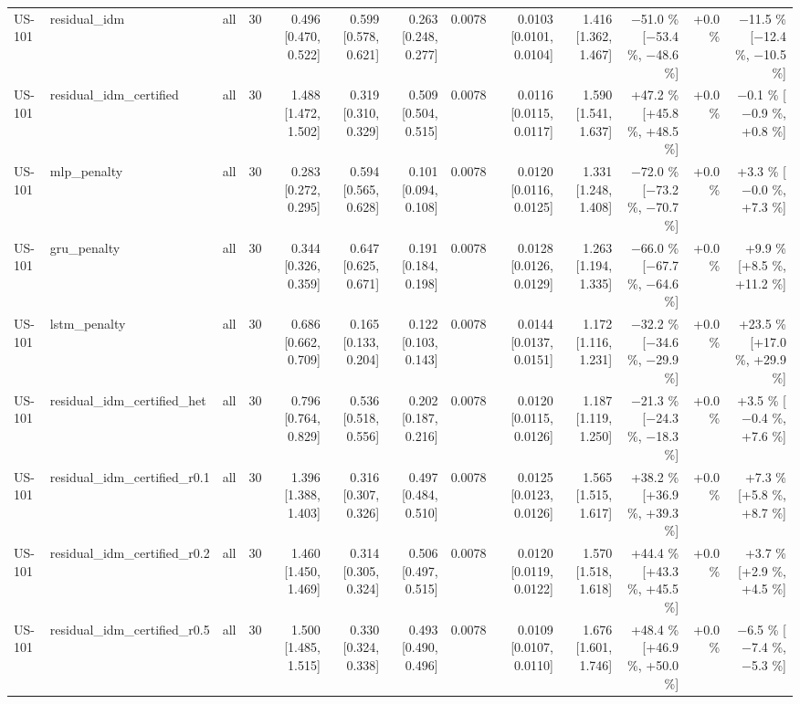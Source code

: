 \begin{table}[htbp]
{\begin{tabular}{lllrrrrrrrrrr}
US-101 & residual\_idm & all & 30 & 0.496 [0.470, 0.522] & 0.599 [0.578, 0.621] & 0.263 [0.248, 0.277] & 0.0078 & 0.0103 [0.0101, 0.0104] & 1.416 [1.362, 1.467] & $-$51.0 \% [$-$53.4 \%, $-$48.6 \%] & +0.0 \% & $-$11.5 \% [$-$12.4 \%, $-$10.5 \%] \\
US-101 & residual\_idm\_certified & all & 30 & 1.488 [1.472, 1.502] & 0.319 [0.310, 0.329] & 0.509 [0.504, 0.515] & 0.0078 & 0.0116 [0.0115, 0.0117] & 1.590 [1.541, 1.637] & +47.2 \% [+45.8 \%, +48.5 \%] & +0.0 \% & $-$0.1 \% [$-$0.9 \%, +0.8 \%] \\
US-101 & mlp\_penalty & all & 30 & 0.283 [0.272, 0.295] & 0.594 [0.565, 0.628] & 0.101 [0.094, 0.108] & 0.0078 & 0.0120 [0.0116, 0.0125] & 1.331 [1.248, 1.408] & $-$72.0 \% [$-$73.2 \%, $-$70.7 \%] & +0.0 \% & +3.3 \% [$-$0.0 \%, +7.3 \%] \\
US-101 & gru\_penalty & all & 30 & 0.344 [0.326, 0.359] & 0.647 [0.625, 0.671] & 0.191 [0.184, 0.198] & 0.0078 & 0.0128 [0.0126, 0.0129] & 1.263 [1.194, 1.335] & $-$66.0 \% [$-$67.7 \%, $-$64.6 \%] & +0.0 \% & +9.9 \% [+8.5 \%, +11.2 \%] \\
US-101 & lstm\_penalty & all & 30 & 0.686 [0.662, 0.709] & 0.165 [0.133, 0.204] & 0.122 [0.103, 0.143] & 0.0078 & 0.0144 [0.0137, 0.0151] & 1.172 [1.116, 1.231] & $-$32.2 \% [$-$34.6 \%, $-$29.9 \%] & +0.0 \% & +23.5 \% [+17.0 \%, +29.9 \%] \\
US-101 & residual\_idm\_certified\_het & all & 30 & 0.796 [0.764, 0.829] & 0.536 [0.518, 0.556] & 0.202 [0.187, 0.216] & 0.0078 & 0.0120 [0.0115, 0.0126] & 1.187 [1.119, 1.250] & $-$21.3 \% [$-$24.3 \%, $-$18.3 \%] & +0.0 \% & +3.5 \% [$-$0.4 \%, +7.6 \%] \\
US-101 & residual\_idm\_certified\_r0.1 & all & 30 & 1.396 [1.388, 1.403] & 0.316 [0.307, 0.326] & 0.497 [0.484, 0.510] & 0.0078 & 0.0125 [0.0123, 0.0126] & 1.565 [1.515, 1.617] & +38.2 \% [+36.9 \%, +39.3 \%] & +0.0 \% & +7.3 \% [+5.8 \%, +8.7 \%] \\
US-101 & residual\_idm\_certified\_r0.2 & all & 30 & 1.460 [1.450, 1.469] & 0.314 [0.305, 0.324] & 0.506 [0.497, 0.515] & 0.0078 & 0.0120 [0.0119, 0.0122] & 1.570 [1.518, 1.618] & +44.4 \% [+43.3 \%, +45.5 \%] & +0.0 \% & +3.7 \% [+2.9 \%, +4.5 \%] \\
US-101 & residual\_idm\_certified\_r0.5 & all & 30 & 1.500 [1.485, 1.515] & 0.330 [0.324, 0.338] & 0.493 [0.490, 0.496] & 0.0078 & 0.0109 [0.0107, 0.0110] & 1.676 [1.601, 1.746] & +48.4 \% [+46.9 \%, +50.0 \%] & +0.0 \% & $-$6.5 \% [$-$7.4 \%, $-$5.3 \%] \\

\end{tabular}}
\end{table}
